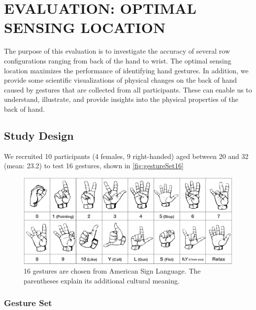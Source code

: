 \documentclass{sigchi}
\begin{document}
\section{EVALUATION: OPTIMAL SENSING LOCATION}

The purpose of this evaluation is to investigate the accuracy of several row configurations ranging from back of the hand to wrist. 
The optimal sensing location maximizes the performance of identifying hand gestures.
In addition, we provide some scientific visualizations of physical changes on the back of hand caused by gestures that are collected from all participants. These can enable us to understand, illustrate, and provide insights into the physical properties of the back of hand. %

\subsection{Study Design}
We recruited 10 participants (4 females, 9 right-handed) aged between 20 and 32 (mean: 23.2) to test 16 gestures, shown in \autoref{fig:gestureSet16}

\begin{figure}
  \begin{center}
  \includegraphics[width=1\columnwidth]{figures/gestureSet_16_v3.pdf}
  \caption{16 gestures are chosen from American Sign Language. The parentheses explain its additional cultural meaning.}
  \label{fig:gestureSet16}
  \end{center}
\end{figure}

\subsubsection{Gesture Set}
\end{document}
